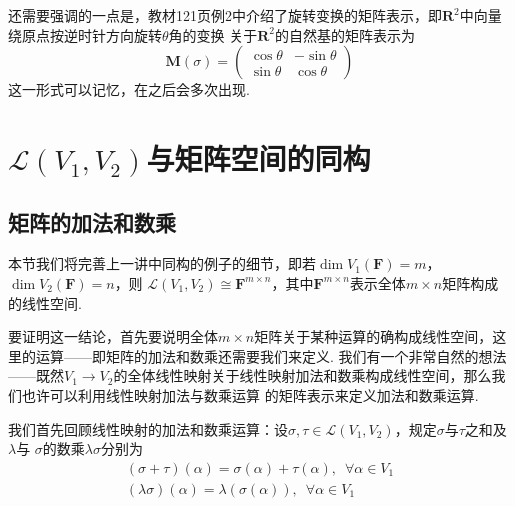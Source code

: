 还需要强调的一点是，教材121页例2中介绍了旋转变换的矩阵表示，即$\mathbf{R}^2$中向量绕原点按逆时针方向旋转$\theta$角的变换
关于$\mathbf{R}^2$的自然基的矩阵表示为
\[\mathbf{M}(\sigma)=\begin{pmatrix}
    \cos\theta & -\sin\theta \\
    \sin\theta & \cos\theta
\end{pmatrix}\]
这一形式可以记忆，在之后会多次出现.

\section{$\mathcal{L}(V_1,V_2)$与矩阵空间的同构}
\subsection{矩阵的加法和数乘}
本节我们将完善上一讲中同构的例子的细节，即若$\dim V_1(\mathbf{F})=m$，$\dim V_2(\mathbf{F})=n$，则
$\mathcal{L}(V_1,V_2) \cong \mathbf{F}^{m \times n}$，其中$\mathbf{F}^{m \times n}$表示全体$m\times n$矩阵构成的线性空间.

要证明这一结论，首先要说明全体$m\times n$矩阵关于某种运算的确构成线性空间，这里的运算——即矩阵的加法和数乘还需要我们来定义.
我们有一个非常自然的想法——既然$V_1\to V_2$的全体线性映射关于线性映射加法和数乘构成线性空间，那么我们也许可以利用线性映射加法与数乘运算
的矩阵表示来定义加法和数乘运算.

我们首先回顾线性映射的加法和数乘运算：设$\sigma,\tau\in \mathcal{L}(V_1,V_2)$，规定$\sigma$与$\tau$之和及$\lambda$与
$\sigma$的数乘$\lambda\sigma$分别为
\begin{gather*}
    (\sigma+\tau)(\alpha)=\sigma(\alpha)+\tau(\alpha),\enspace\forall\alpha\in V_1 \\
    (\lambda\sigma)(\alpha)=\lambda(\sigma(\alpha)),\enspace\forall\alpha\in V_1
\end{gather*}

